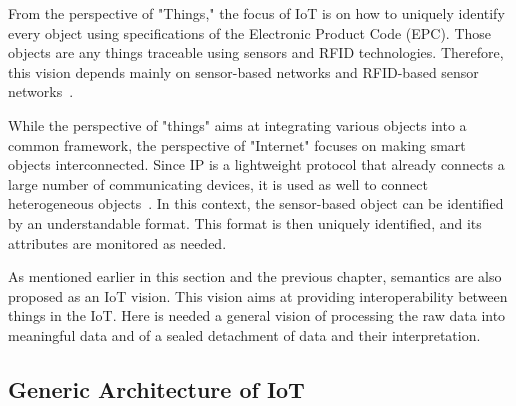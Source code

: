 From the perspective of "Things," the focus of IoT is on how to uniquely identify every object using specifications of the Electronic Product Code (EPC). Those objects are any things traceable using sensors and RFID technologies. Therefore, this vision depends mainly on sensor-based networks and RFID-based sensor networks~\cite{vision2}.\par
While the perspective of "things" aims at integrating various objects into a common framework, the perspective of "Internet" focuses on making smart objects interconnected. Since IP is a lightweight protocol that already connects a large number of communicating devices, it is used as well to connect heterogeneous objects~\cite{vision2}. In this context, the sensor-based object can be identified by an understandable format. This format is then uniquely identified, and its attributes are monitored as needed. \par
As mentioned earlier in this section and the previous chapter, semantics are also proposed as an IoT vision. This vision aims at providing interoperability between things in the IoT. Here is needed a general vision of processing the raw data into meaningful data and of a sealed detachment of data and their interpretation.

\subsection{Generic Architecture of IoT}

